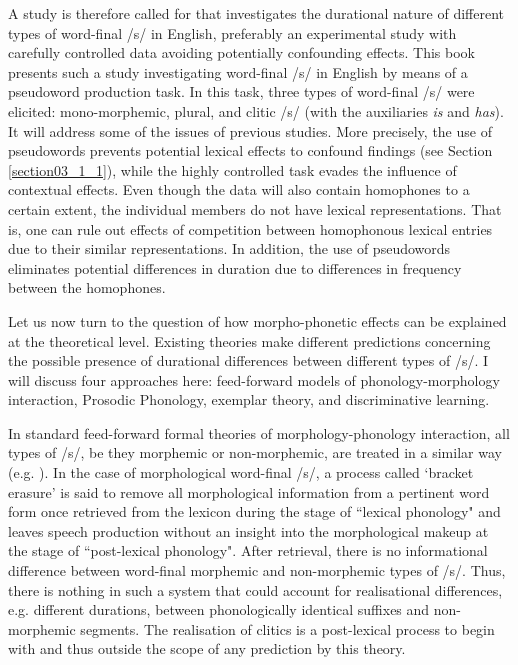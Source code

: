 A study is therefore called for that investigates the durational nature of different types of word-final /s/ in English, preferably an experimental study with carefully controlled data avoiding potentially confounding effects. This book presents such a study investigating word-final /s/ in English by means of a pseudoword production task. In this task, three types of word-final /s/ were elicited: mono-morphemic, plural, and clitic /s/ (with the auxiliaries \textit{is} and \textit{has}). It will address some of the issues of previous studies. More precisely, the use of pseudowords prevents potential lexical effects to confound findings (see Section \ref{section03_1_1}), while the highly controlled task evades the influence of contextual effects. Even though the data will also contain homophones to a certain extent, the individual members do not have lexical representations. That is, one can rule out effects of competition between homophonous lexical entries due to their similar representations. In addition, the use of pseudowords eliminates potential differences in duration due to differences in frequency between the homophones.

Let us now turn to the question of how morpho-phonetic effects can be explained at the theoretical level. Existing theories make different predictions concerning the possible presence of durational differences between different types of /s/. I will discuss four approaches here: feed-forward models of phonology-morphology interaction, Prosodic Phonology, exemplar theory, and discriminative learning. 

In standard feed-forward formal theories of morphology-phonology interaction, all types of /s/, be they morphemic or non-morphemic, are treated in a similar way (e.g. \cite{Chomsky1968,Kiparsky1982}). In the case of morphological word-final /s/, a process called ‘bracket erasure’ is said to remove all morphological information from a pertinent word form once retrieved from the lexicon during the stage of ``lexical phonology" and leaves speech production without an insight into the morphological makeup at the stage of ``post-lexical phonology". After retrieval, there is no informational difference between word-final morphemic and non-morphemic types of /s/. Thus, there is nothing in such a system that could account for realisational differences, e.g. different durations, between phonologically identical suffixes and non-morphemic segments. The realisation of clitics is a post-lexical process to begin with and thus outside the scope of any prediction by this theory.

